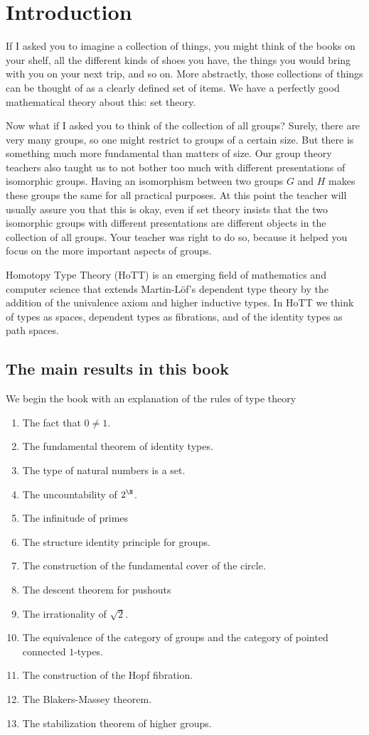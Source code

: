 \chapter{Introduction}

If I asked you to imagine a collection of things, you might think of the books on your shelf, all the different kinds of shoes you have, the things you would bring with you on your next trip, and so on. More abstractly, those collections of things can be thought of as a clearly defined set of items. We have a perfectly good mathematical theory about this: set theory.

Now what if I asked you to think of the collection of all groups? Surely, there are very many groups, so one might restrict to groups of a certain size. But there is something much more fundamental than matters of size. Our group theory teachers also taught us to not bother too much with different presentations of isomorphic groups. Having an isomorphism between two groups $G$ and $H$ makes these groups the same for all practical purposes. At this point the teacher will usually assure you that this is okay, even if set theory insists that the two isomorphic groups with different presentations are different objects in the collection of all groups. Your teacher was right to do so, because it helped you focus on the more important aspects of groups.

Homotopy Type Theory (HoTT) is an emerging field of mathematics and computer science that extends Martin-Löf's dependent type theory by the addition of the univalence axiom and higher inductive types. In HoTT we think of types as spaces, dependent types as fibrations, and of the identity types as path spaces.

\section{The main results in this book}
We begin the book with an explanation of the rules of type theory
\begin{enumerate}
\item The fact that $0\neq 1$.
\item The fundamental theorem of identity types.
\item The type of natural numbers is a set.
\item The uncountability of $2^\N$.
\item The infinitude of primes
\item The structure identity principle for groups.
\item The construction of the fundamental cover of the circle.
\item The descent theorem for pushouts
\item The irrationality of $\sqrt{2}$.
\item The equivalence of the category of groups and the category of pointed connected $1$-types.
\item The construction of the Hopf fibration.
\item The Blakers-Massey theorem.
\item The stabilization theorem of higher groups.
\end{enumerate}



